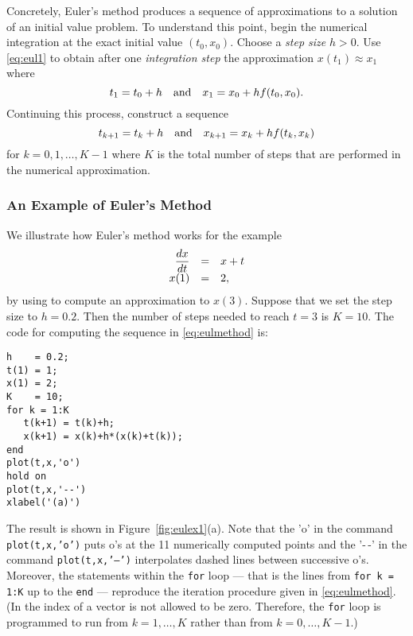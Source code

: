 \documentclass{ximera}
\begin{document}
Concretely, Euler's method produces a sequence of approximations
to a solution of an initial value problem.  To understand this point, 
begin the numerical integration at the exact initial value $(t_0,x_0)$.  
Choose a {\em step size\/} 
$h>0$.  Use \eqref{eq:eul1} to obtain after 
one {\em integration step\/} 
the approximation $x(t_1)\approx x_1$ where
\[
t_1 = t_0+h \quad\mbox{and}\quad x_1 = x_0 + h f(t_0, x_0).
\]
Continuing this process, construct a sequence
\begin{equation}  \label{eq:eulmethod}
t_{k+1} = t_k+h \quad\mbox{and}\quad x_{k+1} = x_k + h f(t_k, x_k)
\end{equation}
for $k=0,1,\ldots,K-1$ where $K$ is the total number of 
steps that are performed in the numerical approximation.

\subsubsection*{An Example of Euler's Method}
We illustrate how Euler's method works for the example
\arraystart
\begin{equation}  \label{eq:eulexivp}
\begin{array}{rcl}
\displaystyle\frac{dx}{dt} & = & x+t\\
  x(1) & = & 2,
\end{array}
\end{equation}
\arrayfinish
by using \Matlab to compute an approximation to $x(3)$.  Suppose that we
set the step size to $h = 0.2$.  Then the number of steps needed to reach 
$t=3$ is $K=10$.  The code for computing the sequence in 
\eqref{eq:eulmethod} is:

\begin{verbatim}
h    = 0.2;
t(1) = 1;
x(1) = 2;
K    = 10;
for k = 1:K
   t(k+1) = t(k)+h;
   x(k+1) = x(k)+h*(x(k)+t(k));
end
plot(t,x,'o')
hold on
plot(t,x,'--')
xlabel('(a)')
\end{verbatim}
The result is shown in Figure~\ref{fig:eulex1}(a).  Note that the
{\sf 'o'} in the \Matlab command {\tt plot(t,x,'o')} puts o's at the 11 
numerically computed points and the {\sf '-\,-'} in the command
{\tt plot(t,x,'--')} interpolates dashed lines between successive o's. 
Moreover, the statements within the {\tt for} loop --- that is the
lines from {\tt for k = 1:K} up to the {\tt end} --- 
reproduce the iteration procedure given in \eqref{eq:eulmethod}.
(In \Matlab the index of a vector is not allowed to be zero. Therefore, 
the {\tt for} loop is programmed to run from $k=1,\ldots,K$ rather than 
from $k=0,\ldots,K-1$.)
\end{document}
